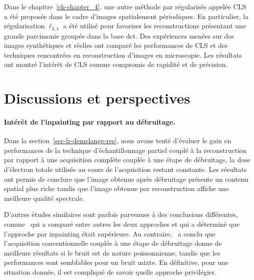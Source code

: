 Dans le chapitre~\ref{ch-chapter_4}, une autre méthode par  régularisés appelée CLS a été proposée dans le cadre d'images spatialement périodiques. En particulier, la régularisation $\ell_{2,1}$ a été utilisé pour favoriser les reconstructions présentant une grande parcimonie groupée dans la base \gls{dct}. Des expériences menées sur des images synthétiques et réelles ont comparé les performances de CLS et des techniques rencontrées en reconstruction d'images en microscopie. Les résultats ont montré l'intérêt de CLS comme compromis de rapidité et de précision.


\section*{Discussions et perspectives}

\paragraph{Intérêt de l'inpainting par rapport au débruitage.} Dans la section~\ref{sec-lr-demelange-res}, nous avons tenté d'évaluer le gain en performances de la technique d'échantillonnage partiel couplé à la reconstruction par rapport à une acquisition complète couplée à une étape de débruitage, la dose d'électron totale utilisée au cours de l'acquisition restant constante. Les résultats ont permis de conclure que l'image obtenue après débruitage présente un contenu spatial plus riche tandis que l'image obtenue par reconstruction affiche une meilleure qualité spectrale.

D'autres études similaires sont parfois parvenues à des conclusions différentes, comme~\cite{trampert2018ultramicroscopy} qui a comparé entre autres les deux approches et qui a déterminé que l'approche par inpainting était supérieure. Au contraire,~\cite{sanders2020inpainting} a conclu que l'acquisition conventionnelle couplée à une étape de débruitage donne de meilleurs résultats si le bruit est de nature poissonnienne, tandis que les performances sont semblables pour un bruit mixte. En définitive, pour une situation donnée, il est compliqué de savoir quelle approche privilégier.

